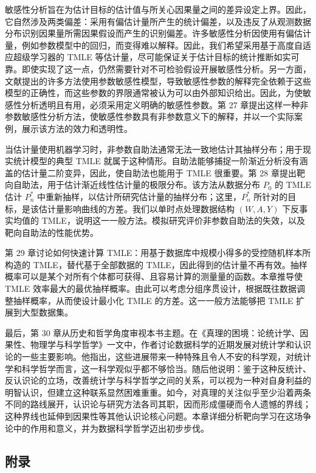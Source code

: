 敏感性分析旨在为估计目标的估计值与所关心因果量之间的差异设定上界。因此，它自然涉及两类偏差：采用有偏估计量所产生的统计偏差，以及违反了从观测数据分布识别因果量所需因果假设而产生的识别偏差。许多敏感性分析因使用有偏估计量，例如参数模型中的回归，而变得难以解释。因此，我们希望采用基于高度自适应超级学习器的 TMLE 等估计量，尽可能保证关于估计目标的统计推断如实可靠。即使实现了这一点，仍然需要针对不可检验假设开展敏感性分析。另一方面，文献提出的许多方法使用参数敏感性模型，导致敏感性参数的解释完全依赖于这些模型的正确性，而这些参数的界限通常被认为可以由外部知识给出。因此，为使敏感性分析透明且有用，必须采用定义明确的敏感性参数。第 27 章提出这样一种非参数敏感性分析方法，使敏感性参数具有非参数意义下的解释，并以一个实际案例，展示该方法的效力和透明性。

当估计量使用机器学习时，非参数自助法通常无法一致地估计其抽样分布；用于现实统计模型的典型 TMLE 就属于这种情形。自助法能够捕捉一阶渐近分析没有涵盖的估计量二阶变异，因此，使自助法也能用于 TMLE 很重要。第 28 章提出靶向自助法，用于估计渐近线性估计量的极限分布。该方法从数据分布 $P_0$ 的 TMLE 估计 $P_n^*$ 中重新抽样，以估计所研究估计量的抽样分布；这里，$P_n^*$ 所针对的目标，是该估计量影响曲线的方差。我们以单时点处理数据结构 $(W,A,Y)$ 下反事实均值的 TMLE，说明这一一般方法。模拟研究评价非参数自助法的失效，以及靶向自助法的性能优势。

第 29 章讨论如何快速计算 TMLE：用基于数据库中规模小得多的受控随机样本所构造的 TMLE，替代基于全部数据的 TMLE，因此得到的估计量不再有效。抽样概率可以是某个对所有个体都可获得、且容易计算的测量量的函数。本章推导使 TMLE 效率最大的最优抽样概率。由此可以考虑分组序贯设计，根据既往数据调整抽样概率，从而使设计最小化 TMLE 的方差。这一一般方法能够把 TMLE 扩展到大型数据集。

最后，第 30 章从历史和哲学角度审视本书主题。在《真理的困境：论统计学、因果性、物理学与科学哲学》一文中，作者讨论数据科学的近期发展对统计学和认识论的一些主要影响。他指出，这些进展带来一种特殊且令人不安的科学观，对统计学和科学哲学而言，这一科学观似乎都不够恰当。随后他说明：鉴于这种反统计、反认识论的立场，改善统计学与科学哲学之间的关系，可以视为一种对自身利益的明智认识，但建立这种联系显然困难重重。如今，对真理的关注似乎至少沿着两条不同的路线展开，认识论与研究方法各司其职，因而形成僵硬而令人遗憾的界线；这种界线也延伸到因果性等其他认识论核心问题。本章详细分析靶向学习在这场争论中的作用和意义，并为数据科学哲学迈出初步步伐。

\subsection*{附录}

